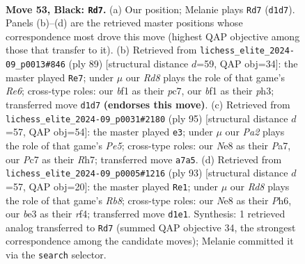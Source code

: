 \documentclass[11pt]{article}
\begin{document}
\clearpage

\begin{figure}[p]\centering
\begin{subfigure}{0.46\textwidth}\centering
\resizebox{\linewidth}{!}{%
\newchessgame
\chessboard[
  setfen={4n3/p1p1k3/8/5p2/r4P1R/4B3/2K4P/3r1BR1 b - - 11 53},
  showmover=false,
  pgfstyle=straightmove, color=movearrow, markmove={d1-d7}
]}
\caption{}
\end{subfigure}\hfill
\begin{subfigure}{0.46\textwidth}\centering
\resizebox{\linewidth}{!}{%
\newchessgame
\chessboard[
  setfen={2r2k2/2P3p1/5p2/7p/2R5/4r2P/5KP1/2R5 b - - 7 45},
  showmover=false,
  pgfstyle=straightmove, color=movearrow, markmove={e3-e7}
]}
\caption{}
\end{subfigure}
\\[4pt]
\begin{subfigure}{0.46\textwidth}\centering
\resizebox{\linewidth}{!}{%
\newchessgame
\chessboard[
  setfen={8/p6r/5k2/8/4pp2/1P5B/P1R1Pr2/6K1 b - - 3 48},
  showmover=false,
  pgfstyle=straightmove, color=movearrow, markmove={e4-e3}
]}
\caption{}
\end{subfigure}\hfill
\begin{subfigure}{0.46\textwidth}\centering
\resizebox{\linewidth}{!}{%
\newchessgame
\chessboard[
  setfen={6k1/2r2p2/6pp/1p6/5RP1/8/5R1P/1r3B1K b - - 0 47},
  showmover=false,
  pgfstyle=straightmove, color=movearrow, markmove={b1-e1}
]}
\caption{}
\end{subfigure}
\caption{\textbf{Move 53, Black: \texttt{Rd7}.} (a) Our position; Melanie plays \texttt{Rd7} (\texttt{d1d7}). Panels (b)--(d) are the retrieved master positions whose correspondence most drove this move (highest QAP objective among those that transfer to it). (b) Retrieved from \texttt{lichess\_elite\_2024-09\_p0013\#846} (ply 89) [structural distance $d$=59, QAP obj=34]: the master played \texttt{Re7}; under $\mu$ our \emph{Rd8} plays the role of that game's \emph{Re6}; cross-type roles: our \emph{b}f1 as their \emph{p}c7, our \emph{b}f1 as their \emph{p}h3; transferred move \texttt{d1d7} \textbf{(endorses this move)}. (c) Retrieved from \texttt{lichess\_elite\_2024-09\_p0031\#2180} (ply 95) [structural distance $d$=57, QAP obj=54]: the master played \texttt{e3}; under $\mu$ our \emph{Pa2} plays the role of that game's \emph{Pe5}; cross-type roles: our \emph{N}e8 as their \emph{P}a7, our \emph{P}c7 as their \emph{R}h7; transferred move \texttt{a7a5}. (d) Retrieved from \texttt{lichess\_elite\_2024-09\_p0005\#1216} (ply 93) [structural distance $d$=57, QAP obj=20]: the master played \texttt{Re1}; under $\mu$ our \emph{Rd8} plays the role of that game's \emph{Rb8}; cross-type roles: our \emph{N}e8 as their \emph{P}h6, our \emph{b}e3 as their \emph{r}f4; transferred move \texttt{d1e1}. Synthesis: 1 retrieved analog transferred to \texttt{Rd7} (summed QAP objective 34, the strongest correspondence among the candidate moves); Melanie committed it via the \texttt{search} selector.}
\label{fig:thought-m105}
\end{figure}
\end{document}
